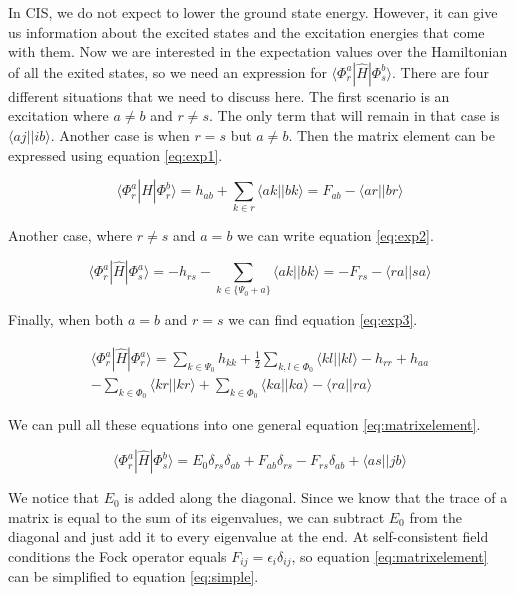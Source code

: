 \documentclass[twoside,twocolumn,9pt]{article}
\begin{document}
In CIS, we do not expect to lower the ground state energy. However, it can give us information about the
excited states and the excitation energies that come with them. Now we are interested in the expectation values over the Hamiltonian of all the exited states, so we need an expression
for $\langle \Phi_r^a |\hat{H}| \Phi_s^b \rangle$. There are four different situations that we need to discuss here\cite{Sherrill1996}. The first scenario is an excitation where
$a \neq b$ and $r \neq s$. The only term that will remain in that case is $\langle aj || ib \rangle$. Another case is when $r = s$ but $a \neq b$. Then the matrix element can be
expressed using equation \eqref{eq:exp1}.

\begin{equation}\label{eq:exp1}
  \langle \Phi_r^a|\hat{H}|\Phi^b_r \rangle = h_{ab} + \sum_{k\in r} \langle ak || bk \rangle = F_{ab} - \langle ar||br \rangle
\end{equation}

Another case, where $r \neq s$ and $a = b$ we can write equation \eqref{eq:exp2}.

\begin{equation}\label{eq:exp2}
  \langle \Phi_r^a|\hat{H}|\Phi^a_s \rangle = -h_{rs} - \sum_{k \in \{\Psi_0 + a\}} \langle ak || bk \rangle = -F_{rs} - \langle ra || sa \rangle
\end{equation}

Finally, when both $a = b$ and $r = s$ we can find equation \eqref{eq:exp3}.

\begin{multline}\label{eq:exp3}
  \langle \Phi^a_r|\hat{H}|\Phi^a_r \rangle = \sum_{k \in \Psi_0}h_{kk} + \frac{1}{2}\sum_{k,l \in \Phi_0} \langle kl||kl \rangle - h_{rr} + h_{aa} \\ - \sum_{k \in \Phi_0} \langle
  kr || kr \rangle + \sum_{k \in \Phi_0} \langle ka||ka \rangle - \langle ra||ra \rangle
\end{multline}

We can pull all these equations into one general equation \eqref{eq:matrixelement}.

\begin{equation}\label{eq:matrixelement}
  \langle \Phi_r^a|\hat{H}|\Phi_s^b \rangle = E_0\delta_{rs}\delta_{ab} + F_{ab}\delta_{rs} - F_{rs}\delta_{ab} + \langle as || jb \rangle
\end{equation}

We notice that $E_0$ is added along the diagonal. Since we know that the trace of a matrix is equal to the sum of its eigenvalues, we can subtract $E_0$ from the diagonal and just
add it to every eigenvalue at the end. At self-consistent field conditions the Fock operator equals $F_{ij} = \epsilon_i\delta_{ij}$, so equation \eqref{eq:matrixelement} can be
simplified to equation \eqref{eq:simple}.
\end{document}
